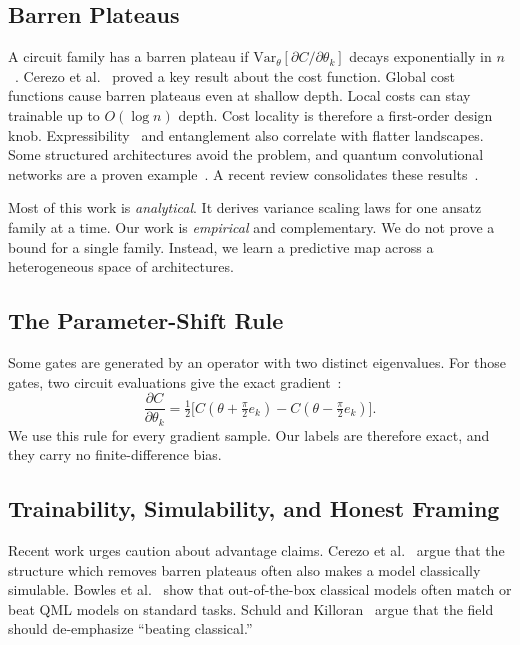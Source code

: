 \documentclass[quantumrep,article,submit,pdftex,oneauthor]{Definitions/mdpi}
\begin{document}
\subsection{Barren Plateaus}
A circuit family has a barren plateau if
$\mathrm{Var}_\theta[\partial C/\partial\theta_k]$ decays exponentially in
$n$~\cite{mcclean2018barren}. Cerezo et al.~\cite{cerezo2021cost} proved a key
result about the cost function. Global cost functions cause barren plateaus even
at shallow depth. Local costs can stay trainable up to $O(\log n)$ depth. Cost
locality is therefore a first-order design knob.
Expressibility~\cite{holmes2022expressibility} and entanglement also correlate
with flatter landscapes. Some structured architectures avoid the problem, and
quantum convolutional networks are a proven example~\cite{pesah2021absence}. A
recent review consolidates these results~\cite{larocca2025barren}.

Most of this work is \emph{analytical}. It derives variance scaling laws for one
ansatz family at a time. Our work is \emph{empirical} and complementary. We do
not prove a bound for a single family. Instead, we learn a predictive map across
a heterogeneous space of architectures.

\subsection{The Parameter-Shift Rule}
Some gates are generated by an operator with two distinct eigenvalues. For those
gates, two circuit evaluations give the exact
gradient~\cite{mitarai2018circuit,schuld2019param}:
\begin{equation}
\frac{\partial C}{\partial\theta_k}
  = \tfrac{1}{2}\big[C(\theta + \tfrac{\pi}{2}e_k)
  - C(\theta - \tfrac{\pi}{2}e_k)\big].
\end{equation}
We use this rule for every gradient sample. Our labels are therefore exact, and
they carry no finite-difference bias.

\subsection{Trainability, Simulability, and Honest Framing}
Recent work urges caution about advantage claims. Cerezo et
al.~\cite{cerezo2025simulability} argue that the structure which removes barren
plateaus often also makes a model classically simulable. Bowles et
al.~\cite{bowles2024benchmarking} show that out-of-the-box classical models often
match or beat QML models on standard tasks. Schuld and
Killoran~\cite{schuld2022killoran} argue that the field should de-emphasize
``beating classical.''
\end{document}
